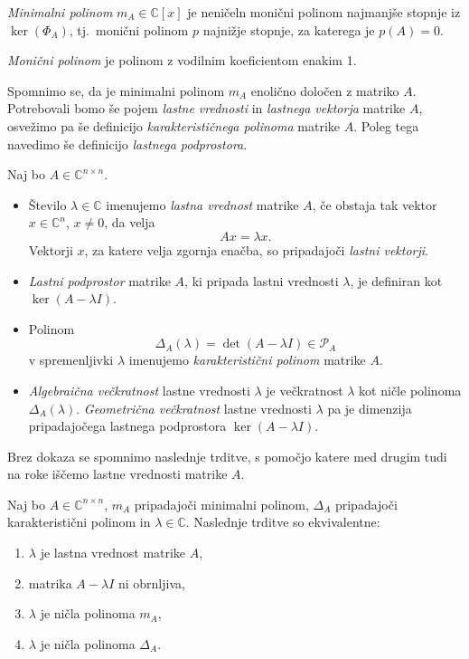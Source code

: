\documentclass[mat1]{fmfdelo}
\newcommand{\C}{\mathbb C}
\begin{document}
\begin{definicija}
    \emph{Minimalni polinom} $m_A \in \C[x]$ je neničeln monični polinom najmanjše stopnje iz $\ker(\Phi_A)$, tj.\ monični polinom $p$ najnižje stopnje, za katerega je $p(A) = 0$.
\end{definicija}
\begin{opomba}
    \emph{Monični polinom} je polinom z vodilnim koeficientom enakim 1.
\end{opomba}
Spomnimo se, da je minimalni polinom $m_A$ enolično določen z matriko $A$. Potrebovali bomo še pojem \emph{lastne vrednosti} in \emph{lastnega vektorja} matrike $A$, osvežimo pa še definicijo \emph{karakterističnega polinoma} matrike $A$. Poleg tega navedimo še definicijo \emph{lastnega podprostora}.
\begin{definicija}
    Naj bo $A \in \C^{n\times n}$.
    \begin{itemize}
        \item Število $\lambda \in \C$ imenujemo \emph{lastna vrednost} matrike $A$, če obstaja tak vektor $x \in \C^n$, $x \neq 0$, da velja
        \begin{equation*}
            Ax = \lambda x.
        \end{equation*}
        Vektorji $x$, za katere velja zgornja enačba, so pripadajoči \emph{lastni vektorji}.
        \item \emph{Lastni podprostor} matrike $A$, ki pripada lastni vrednosti $\lambda$, je definiran kot $\ker (A - \lambda I)$.
        \item Polinom
        \begin{equation*}
            \Delta_A(\lambda) = \det (A - \lambda I) \in \mathcal{P}_A
        \end{equation*}
        v spremenljivki $\lambda$ imenujemo \emph{karakteristični polinom} matrike $A$.
        \item \emph{Algebraična večkratnost} lastne vrednosti $\lambda$ je večkratnost $\lambda$ kot ničle polinoma $\Delta_A(\lambda)$. \emph{Geometrična večkratnost} lastne vrednosti $\lambda$ pa je dimenzija pripadajočega lastnega podprostora $\ker (A - \lambda I)$.
    \end{itemize}
\end{definicija}
Brez dokaza se spomnimo naslednje trditve, s pomočjo katere med drugim tudi na roke iščemo lastne vrednosti matrike $A$.
\begin{trditev}
    Naj bo $A \in \C^{n \times n}$, $m_A$ pripadajoči minimalni polinom, $\Delta_A$ pripadajoči karakteristični polinom in $\lambda \in \C$. Naslednje trditve so ekvivalentne:
    \begin{enumerate}
        \item $\lambda$ je lastna vrednost matrike $A$,
        \item matrika $A- \lambda I$ ni obrnljiva,
        \item $\lambda$ je ničla polinoma $m_A$,
        \item $\lambda$ je ničla polinoma $\Delta_A$.
    \end{enumerate}
\end{trditev}
\end{document}
